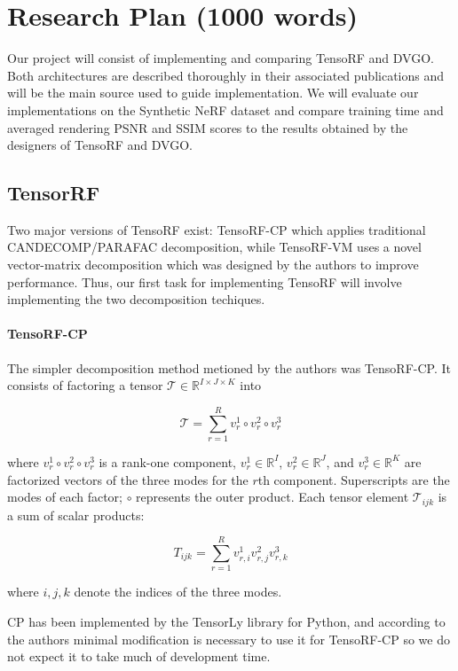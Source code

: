 \documentclass[conference]{IEEEtran}
\begin{document}
\section{Research Plan (1000 words)}

Our project will consist of implementing and comparing TensoRF and DVGO. Both architectures
are described thoroughly in their associated publications and will be the main source used
to guide implementation. We will evaluate our implementations on the Synthetic NeRF dataset
and compare training time and averaged rendering PSNR and SSIM scores to the results obtained
by the designers of TensoRF and DVGO.

\subsection{TensorRF}

Two major versions of TensoRF exist: TensoRF-CP which applies traditional CANDECOMP/PARAFAC
decomposition, while TensoRF-VM uses a novel vector-matrix decomposition which was designed by
the authors to improve performance. Thus, our first task for implementing TensoRF will involve
implementing the two decomposition techiques.

\paragraph{TensoRF-CP} The simpler decomposition method metioned by the authors was
TensoRF-CP.
It consists of factoring a tensor \(\mathcal{T} \in \mathbb{R}^{I \times J \times K}\) into

\[\mathcal{T} = \sum_{r=1}^{R} v_{r}^{1} \circ v_{r}^{2} \circ v_{r}^{3}\]

where \(v_{r}^{1} \circ v_{r}^{2} \circ v_{r}^{3}\) is a rank-one component,
\(v_{r}^{1} \in \mathbb{R}^I\),  \(v_{r}^{2} \in \mathbb{R}^J\), and \(v_{r}^{3} \in \mathbb{R}^K\)
are factorized vectors of the three modes for the \(r\)th component.
Superscripts are the modes of each factor; \(\circ\) represents the outer product.
Each tensor element \(\mathcal{T}_{ijk}\) is a sum of scalar products:

\[T_{ijk} = \sum_{r=1}^{R} v_{r,i}^{1}v_{r,j}^{2}v_{r,k}^{3}\]

where \(i, j, k\) denote the indices of the three modes.

CP has been implemented by the TensorLy library for Python, and according to the
authors minimal modification is necessary to use it for TensoRF-CP so we do not
expect it to take much of development time.
\end{document}
